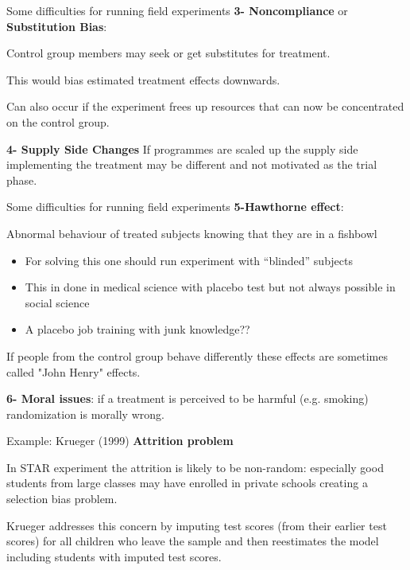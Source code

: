 \documentclass{beamer}
\begin{document}
\begin{frame}{Some difficulties for running field experiments}
\textbf{3- Noncompliance} or \textbf{Substitution Bias}:\medskip

Control group members may seek or get substitutes for treatment.\medskip

This would bias estimated treatment effects downwards.\medskip

Can also occur if the experiment frees up resources that can now be concentrated on the control group.\bigskip

\textbf{4- Supply Side Changes}
If programmes are scaled up the supply side implementing the
treatment may be different and not motivated as the trial phase.
\end{frame}

\begin{frame}{Some difficulties for running field experiments}
\textbf{5-Hawthorne effect}: \medskip

Abnormal behaviour of treated subjects knowing that they are in a fishbowl
\begin{itemize}
\item For solving this one should run experiment with ``blinded'' subjects
\item This in done in medical science with placebo test but not always possible in social science
\item A placebo job training with junk knowledge??
\end{itemize}
If people from the control group behave differently these effects are sometimes called "John Henry" effects.\bigskip

\textbf{6- Moral issues}: if a treatment is perceived to be harmful (e.g. smoking) randomization is morally wrong.
\end{frame}

\begin{frame}{Example: Krueger (1999)}
\textbf{Attrition problem}\medskip

In STAR experiment the attrition is likely to be non-random: especially good students from large classes may have enrolled in private schools creating a selection bias problem.\medskip

Krueger addresses this concern by imputing test scores (from their earlier test scores) for all children who leave the sample and then reestimates the model including students with imputed test scores.
\end{frame}
\end{document}
